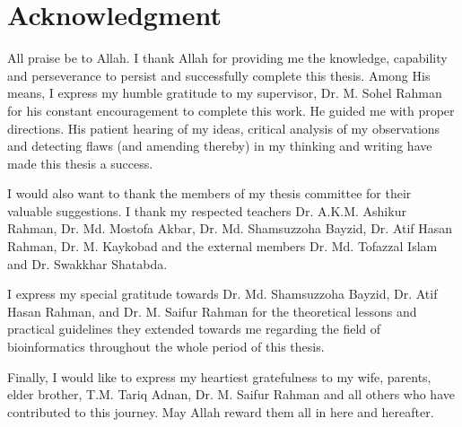 \chapter*{Acknowledgment}

All praise be to Allah. I thank Allah for providing me the knowledge, capability and perseverance to persist and successfully complete this thesis. Among His means, I express my  humble gratitude to my supervisor, Dr. M. Sohel Rahman for his constant encouragement to complete this work. He guided me with proper directions. His patient hearing of my ideas, critical analysis of my observations and detecting flaws (and amending thereby) in my thinking and writing have made this thesis a success.

I would also want to thank the members of my thesis committee for their valuable
suggestions. I thank my respected teachers Dr. A.K.M. Ashikur Rahman, Dr. Md. Mostofa Akbar, Dr. Md. Shamsuzzoha Bayzid, Dr. Atif Hasan Rahman, Dr. M. Kaykobad and the external members Dr. Md. Tofazzal Islam and Dr. Swakkhar Shatabda.

I express my special gratitude towards Dr. Md. Shamsuzzoha Bayzid, Dr. Atif Hasan Rahman, and Dr. M. Saifur Rahman for the theoretical lessons and practical guidelines they extended towards me regarding the field of bioinformatics throughout the whole period of this thesis.  

Finally, I would like to express my heartiest gratefulness to my wife, parents, elder brother, T.M. Tariq Adnan, Dr. M. Saifur Rahman and all others who have contributed to this journey. May Allah reward them all in here and hereafter.